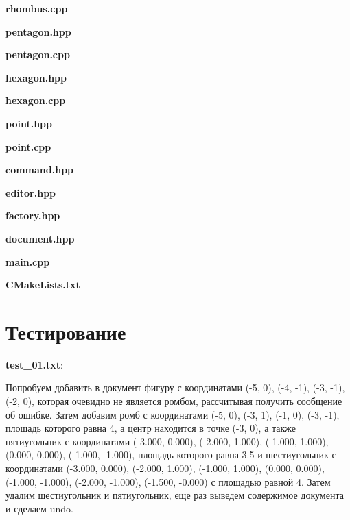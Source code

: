 \documentclass[a4paper, 12pt]{article}
\begin{document}
\vspace{3ex}
\textbf{\large{rhombus.cpp}}


\vspace{3ex}
\textbf{\large{pentagon.hpp}}


\vspace{3ex}
\textbf{\large{pentagon.cpp}}


\vspace{3ex}
\textbf{\large{hexagon.hpp}}


\vspace{3ex}
\textbf{\large{hexagon.cpp}}


\vspace{3ex}
\textbf{\large{point.hpp}}


\vspace{3ex}
\textbf{\large{point.cpp}}


\vspace{3ex}
\textbf{\large{command.hpp}}


\vspace{3ex}
\textbf{\large{editor.hpp}}


\vspace{3ex}
\textbf{\large{factory.hpp}}


\vspace{3ex}
\textbf{\large{document.hpp}}


\vspace{3ex}
\textbf{\large{main.cpp}}



\vspace{3ex}
\textbf{\large{CMakeLists.txt}}

\newpage
\section{Тестирование}
\vspace{3ex}

\textbf{test\_01.txt}:

Попробуем добавить в документ фигуру с координатами (-5, 0), (-4, -1), (-3, -1), (-2, 0), которая очевидно не является ромбом, рассчитывая получить сообщение об ошибке. Затем добавим ромб с координатами (-5, 0), (-3, 1), (-1, 0), (-3, -1), площадь которого равна 4, а центр находится в точке (-3, 0), а также пятиугольник с координатами (-3.000, 0.000), (-2.000, 1.000), (-1.000, 1.000), (0.000, 0.000), (-1.000, -1.000), площадь которого равна 3.5 и шестиугольник с координатами
(-3.000, 0.000), (-2.000, 1.000), (-1.000, 1.000), (0.000, 0.000), (-1.000, -1.000), (-2.000, -1.000), (-1.500, -0.000) с площадью равной 4. Затем удалим шестиугольник и пятиугольник, еще раз выведем содержимое документа и сделаем undo.
\end{document}
